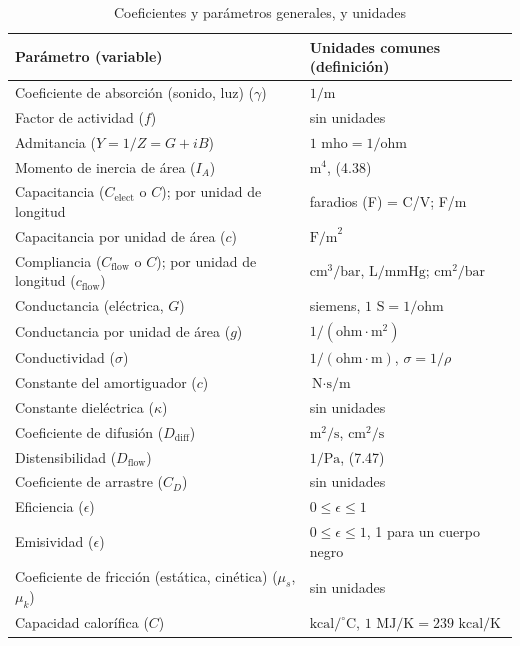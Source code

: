 \documentclass[12pt,a4paper]{book}
\begin{document}
\begin{table}[htbp]
  \centering
  \caption{Coeficientes y parámetros generales, y unidades}
  \label{tab:A.3}
  \begin{tabularx}{\textwidth}{>{\hsize=1.0\hsize}X >{\hsize=1.0\hsize}X}
    \toprule
    \textbf{Parámetro (variable)} & \textbf{Unidades comunes (definición)} \\
    \midrule
    Coeficiente de absorción (sonido, luz) ($\gamma$) & $1/\text{m}$ \\
    Factor de actividad ($f$) & sin unidades \\
    Admitancia ($Y = 1/Z = G + iB$) & $1\text{ mho} = 1/\text{ohm}$ \\
    Momento de inercia de área ($I_A$) & $\text{m}^4$, (4.38) \\
    Capacitancia ($C_{\text{elect}}$ o $C$); por unidad de longitud & faradios (F) = C/V; F/m \\
    Capacitancia por unidad de área ($c$) & $\text{F/m}^2$ \\
    Compliancia ($C_{\text{flow}}$ o $C$); por unidad de longitud ($c_{\text{flow}}$) & $\text{cm}^3/\text{bar}$, $\text{L/mmHg}$; $\text{cm}^2/\text{bar}$ \\
    Conductancia (eléctrica, $G$) & siemens, $1\text{ S} = 1/\text{ohm}$ \\
    Conductancia por unidad de área ($g$) & $1/(\text{ohm}\cdot\text{m}^2)$ \\
    Conductividad ($\sigma$) & $1/(\text{ohm}\cdot\text{m})$, $\sigma = 1/\rho$ \\
    Constante del amortiguador ($c$) & $\text{N}\cdot\text{s/m}$ \\
    Constante dieléctrica ($\kappa$) & sin unidades \\
    Coeficiente de difusión ($D_{\text{diff}}$) & $\text{m}^2/\text{s}$, $\text{cm}^2/\text{s}$ \\
    Distensibilidad ($D_{\text{flow}}$) & $1/\text{Pa}$, (7.47) \\
    Coeficiente de arrastre ($C_D$) & sin unidades \\
    Eficiencia ($\epsilon$) & $0 \le \epsilon \le 1$ \\
    Emisividad ($\epsilon$) & $0 \le \epsilon \le 1$, 1 para un cuerpo negro \\
    Coeficiente de fricción (estática, cinética) ($\mu_s$, $\mu_k$) & sin unidades \\
    Capacidad calorífica ($C$) & $\text{kcal}/^\circ\text{C}$, $1\text{ MJ/K} = 239\text{ kcal/K}$ \\

\end{tabularx}
\end{table}
\end{document}
